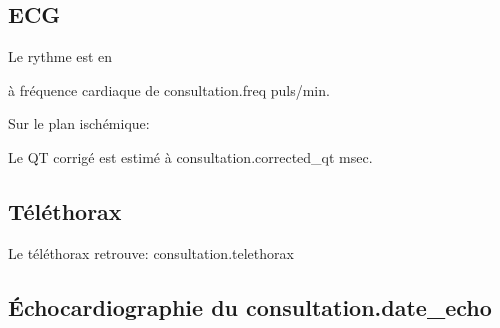 \documentclass[headlines=6,headinclude=true,11pt]{scrartcl}
\begin{document}
\subsection*{ECG}
Le rythme est en {%
          à fréquence cardiaque de {{ consultation.freq }} puls/min.\\

  {%
    {%
      Sur le plan ischémique: {%
              {%
                      {%
            Le QT corrigé est estimé à {{ consultation.corrected_qt }} msec. 
            
{%
 \subsection*{Téléthorax}
Le téléthorax retrouve: {{ consultation.telethorax }} \\
{%
             
\subsection*{Échocardiographie du {{ consultation.date_echo }} }
                
}}}}}}}}
\end{document}
